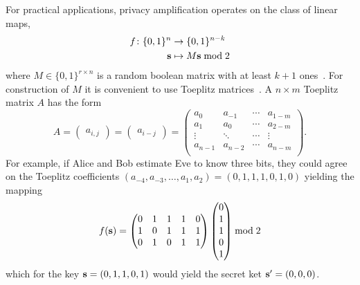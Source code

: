 For practical applications, privacy amplification operates on the class of linear maps,
\begin{equation}
	\begin{split}
		f\colon\{0,1\}^n&\to \{0,1\}^{n-k}\\
		\vb{s}&\mapsto M\vb{s}\bmod{2}
	\end{split}
\end{equation}
where $M\in\{0,1\}^{r\times n}$ is a random boolean matrix with at least $k+1$ ones~\cite{Bennett1985}.
For construction of $M$ it is convenient to use Toeplitz matrices~\cite[p.~11]{Fung2010}.
A $n\times m$ Toeplitz matrix $A$ has the form
\begin{equation}
	A
	=
	\begin{pmatrix}
		a_{i,j}
	\end{pmatrix}
	=
	\begin{pmatrix}
		a_{i-j}
	\end{pmatrix}
	=
	\begin{pmatrix}
		a_0 & a_{-1} & \cdots & a_{1-m} \\
		a_1 & a_0 & \cdots & a_{2-m} \\
		\vdots & \ddots & \cdots & \vdots \\
		a_{n-1} & a_{n-2} & \cdots & a_{n-m} \\
	\end{pmatrix}
	.
\end{equation}
For example, if Alice and Bob estimate Eve to know three bits, they could agree on the Toeplitz coefficients $(a_{-4},a_{-3},\dots,a_1,a_2)=(0,1,1,1,0,1,0)$ yielding the mapping
\begin{equation}
	f(\vb{s})
	=
	\begin{pmatrix}
		0 & 1 & 1 & 1 & 0 \\
		1 & 0 & 1 & 1 & 1 \\
		0 & 1 & 0 & 1 & 1 \\
	\end{pmatrix}
	\begin{pmatrix}
		0 \\
		1 \\
		1 \\
		0 \\
		1 \\
	\end{pmatrix}
	\bmod{2}
\end{equation}
which for the key $\vb{s}=(0,1,1,0,1)$ would yield the secret ket $\vb{s}^\prime=(0,0,0)$.
